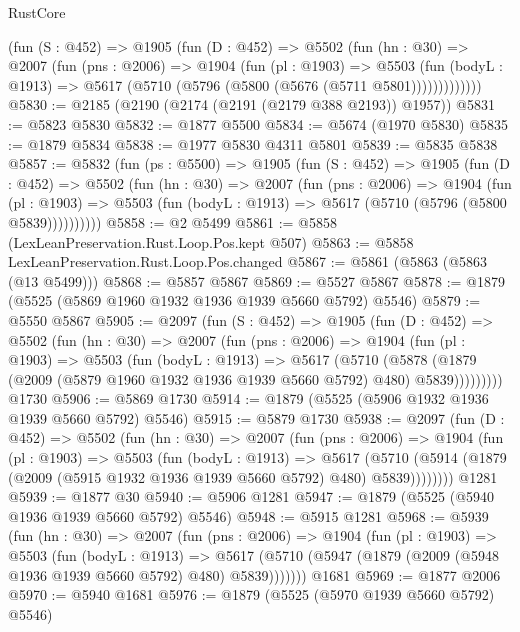 \begin{lexlean}{RustCore}
\begin{coremodule}
        (fun (S : @452) =>
        @1905
          (fun (D : @452) =>
          @5502
            (fun (hn : @30) =>
            @2007
              (fun (pns : @2006) =>
              @1904
                (fun (pl : @1903) =>
                @5503
                  (fun (bodyL : @1913) =>
                  @5617 (@5710 (@5796 (@5800 (@5676 (@5711 @5801)))))))))))))
@5830 := @2185 (@2190 (@2174 (@2191 (@2179 @388 @2193)) @1957))
@5831 := @5823 @5830
@5832 := @1877 @5500
@5834 := @5674 (@1970 @5830)
@5835 := @1879 @5834
@5838 := @1977 @5830 @4311 @5801
@5839 := @5835 @5838
@5857 := @5832
    (fun (ps : @5500) =>
    @1905
      (fun (S : @452) =>
      @1905
        (fun (D : @452) =>
        @5502
          (fun (hn : @30) =>
          @2007
            (fun (pns : @2006) =>
            @1904
              (fun (pl : @1903) =>
              @5503 (fun (bodyL : @1913) => @5617 (@5710 (@5796 (@5800 @5839))))))))))
@5858 := @2 @5499
@5861 := @5858 (LexLeanPreservation.Rust.Loop.Pos.kept @507)
@5863 := @5858 LexLeanPreservation.Rust.Loop.Pos.changed
@5867 := @5861 (@5863 (@5863 (@13 @5499)))
@5868 := @5857 @5867
@5869 := @5527 @5867
@5878 := @1879 (@5525 (@5869 @1960 @1932 @1936 @1939 @5660 @5792) @5546)
@5879 := @5550 @5867
@5905 := @2097
    (fun (S : @452) =>
    @1905
      (fun (D : @452) =>
      @5502
        (fun (hn : @30) =>
        @2007
          (fun (pns : @2006) =>
          @1904
            (fun (pl : @1903) =>
            @5503
              (fun (bodyL : @1913) =>
              @5617
                (@5710
                  (@5878
                    (@1879 (@2009 (@5879 @1960 @1932 @1936 @1939 @5660 @5792) @480) @5839)))))))))
    @1730
@5906 := @5869 @1730
@5914 := @1879 (@5525 (@5906 @1932 @1936 @1939 @5660 @5792) @5546)
@5915 := @5879 @1730
@5938 := @2097
    (fun (D : @452) =>
    @5502
      (fun (hn : @30) =>
      @2007
        (fun (pns : @2006) =>
        @1904
          (fun (pl : @1903) =>
          @5503
            (fun (bodyL : @1913) =>
            @5617
              (@5710 (@5914 (@1879 (@2009 (@5915 @1932 @1936 @1939 @5660 @5792) @480) @5839))))))))
    @1281
@5939 := @1877 @30
@5940 := @5906 @1281
@5947 := @1879 (@5525 (@5940 @1936 @1939 @5660 @5792) @5546)
@5948 := @5915 @1281
@5968 := @5939
    (fun (hn : @30) =>
    @2007
      (fun (pns : @2006) =>
      @1904
        (fun (pl : @1903) =>
        @5503
          (fun (bodyL : @1913) =>
          @5617 (@5710 (@5947 (@1879 (@2009 (@5948 @1936 @1939 @5660 @5792) @480) @5839)))))))
    @1681
@5969 := @1877 @2006
@5970 := @5940 @1681
@5976 := @1879 (@5525 (@5970 @1939 @5660 @5792) @5546)

\end{coremodule}
\end{lexlean}
